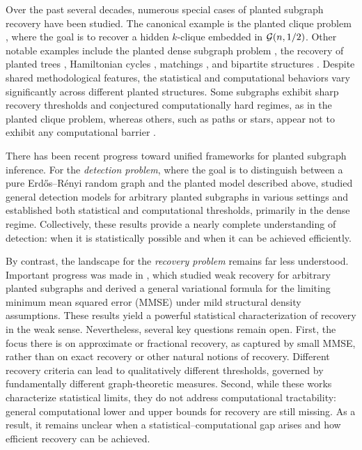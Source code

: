 \documentclass[12pt]{article}
\newcommand{\calG}{{\cal G}}
\begin{document}
Over the past several decades, numerous special cases of planted subgraph recovery have been studied. The canonical example is the planted clique problem \cite{jerrum1992large}, where the goal is to recover a hidden $k$-clique embedded in $\calG(n,1/2)$. Other notable examples include the planted dense subgraph problem \cite{arias2014community,arias2015detecting,hajek2015computational}, the recovery of planted trees \cite{massoulie19a}, Hamiltonian cycles \cite{Bagaria20}, matchings \cite{10.1214/20-AAP1660}, and bipartite structures \cite{HuleihelBip}. Despite shared methodological features, the statistical and computational behaviors vary significantly across different planted structures. Some subgraphs exhibit sharp recovery thresholds and conjectured computationally hard regimes, as in the planted clique problem, whereas others, such as paths or stars, appear not to exhibit any computational barrier \cite{massoulie19a}.

There has been recent progress toward unified frameworks for planted subgraph inference. For the \emph{detection problem}, where the goal is to distinguish between a pure Erd\H{o}s--R\'enyi random graph and the planted model described above, \cite{addario2010combinatorial,Huleihel2022,pmlr-v247-yu24a,elimelech2025detecting,ElimelechHuleihel2025SemiRandom} studied general detection models for arbitrary planted subgraphs in various settings and established both statistical and computational thresholds, primarily in the dense regime. Collectively, these results provide a nearly complete understanding of detection: when it is statistically possible and when it can be achieved efficiently.

By contrast, the landscape for the \emph{recovery problem} remains far less understood. Important progress was made in \cite{pmlr-v195-mossel23a,LeePerniceRajaramanZadik2025}, which studied weak recovery for arbitrary planted subgraphs and derived a general variational formula for the limiting minimum mean squared error (MMSE) under mild structural density assumptions. These results yield a powerful statistical characterization of recovery in the weak sense. Nevertheless, several key questions remain open. First, the focus there is on approximate or fractional recovery, as captured by small MMSE, rather than on exact recovery or other natural notions of recovery. Different recovery criteria can lead to qualitatively different thresholds, governed by fundamentally different graph-theoretic measures. Second, while these works characterize statistical limits, they do not address computational tractability: general computational lower and upper bounds for recovery are still missing. As a result, it remains unclear when a statistical--computational gap arises and how efficient recovery can be achieved.
\end{document}
